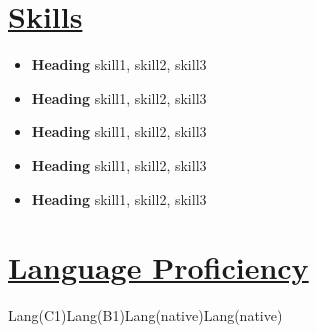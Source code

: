 \documentclass[a4paper,11pt]{article}
\newcommand{\longunderline}[1]{\uline{#1\hfill\mbox{}}}
\begin{document}
\section*{\longunderline{Skills}}
    \begin{itemize}[noitemsep,topsep=0pt]
    \item \textbf{Heading} skill1, skill2, skill3 
    \item \textbf{Heading} skill1, skill2, skill3 
    \item \textbf{Heading} skill1, skill2, skill3 
    \item \textbf{Heading} skill1, skill2, skill3 
    \item \textbf{Heading} skill1, skill2, skill3 
    \end{itemize}
    
\section*{\longunderline{Language Proficiency}}
    Lang(C1)\hfill Lang(B1)\hfill Lang(native)\hfill Lang(native)
    
\end{document}
